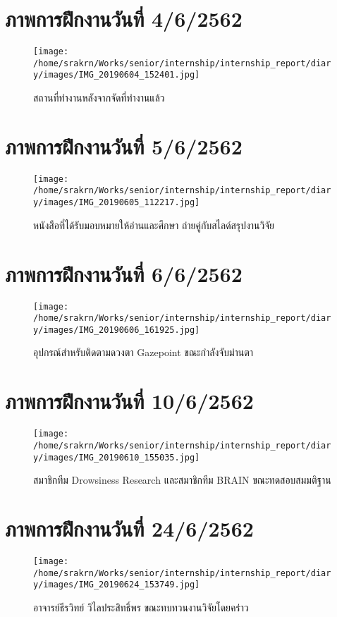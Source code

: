 
\section*{ภาพการฝึกงานวันที่ 4/6/2562}
\begin{figure}[H]
    \centering
    \texttt{[image: /home/srakrn/Works/senior/internship/internship\_report/diary/images/IMG\_20190604\_152401.jpg]}
    \caption{สถานที่ทำงานหลังจากจัดที่ทำงานแล้ว}
\end{figure}

\section*{ภาพการฝึกงานวันที่ 5/6/2562}
\begin{figure}[H]
    \centering
    \texttt{[image: /home/srakrn/Works/senior/internship/internship\_report/diary/images/IMG\_20190605\_112217.jpg]}
    \caption{หนังสือที่ได้รับมอบหมายให้อ่านและศึกษา ถ่ายคู่กับสไลด์สรุปงานวิจัย}
\end{figure}

\section*{ภาพการฝึกงานวันที่ 6/6/2562}
\begin{figure}[H]
    \centering
    \texttt{[image: /home/srakrn/Works/senior/internship/internship\_report/diary/images/IMG\_20190606\_161925.jpg]}
    \caption{อุปกรณ์สำหรับติดตามดวงตา Gazepoint ขณะกำลังจับม่านตา}
\end{figure}

\section*{ภาพการฝึกงานวันที่ 10/6/2562}
\begin{figure}[H]
    \centering
    \texttt{[image: /home/srakrn/Works/senior/internship/internship\_report/diary/images/IMG\_20190610\_155035.jpg]}
    \caption{สมาชิกทีม Drowsiness Research และสมาชิกทีม BRAIN ขณะทดสอบสมมติฐาน}
\end{figure}

\section*{ภาพการฝึกงานวันที่ 24/6/2562}
\begin{figure}[H]
    \centering
    \texttt{[image: /home/srakrn/Works/senior/internship/internship\_report/diary/images/IMG\_20190624\_153749.jpg]}
    \caption{อาจารย์ธีรวิทย์ วิไลประสิทธิ์พร ขณะทบทวนงานวิจัยโดยคร่าว}
\end{figure}

